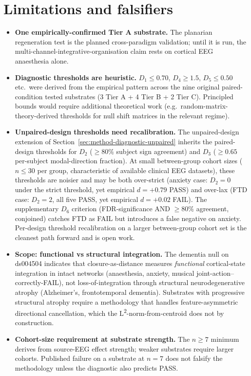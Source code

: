 \documentclass[11pt,a4paper]{article}
\begin{document}
\section{Limitations and falsifiers}\label{sec:limits}

\begin{itemize}\itemsep0pt
\item \textbf{One empirically-confirmed Tier A substrate.} The planarian regeneration test is the planned cross-paradigm validation; until it is run, the multi-channel-integrative-organisation claim rests on cortical EEG anaesthesia alone.
\item \textbf{Diagnostic thresholds are heuristic.} $D_1 \leq 0.70$, $D_4 \geq 1.5$, $D_5 \leq 0.50$ etc.\ were derived from the empirical pattern across the nine original paired-condition tested substrates (3 Tier A + 4 Tier B + 2 Tier C). Principled bounds would require additional theoretical work (e.g.\ random-matrix-theory-derived thresholds for null shift matrices in the relevant regime).
\item \textbf{Unpaired-design thresholds need recalibration.} The unpaired-design extension of Section~\ref{sec:method-diagnostic-unpaired} inherits the paired-design thresholds for $D_2$ ($\geq 80\%$ subject sign agreement) and $D_3$ ($\geq 0.65$ per-subject modal-direction fraction). At small between-group cohort sizes ($n \leq 30$ per group, characteristic of available clinical EEG datasets), these thresholds are noisier and may be both over-strict (anxiety case: $D_2 = 0$ under the strict threshold, yet empirical $d = +0.79$ PASS) and over-lax (FTD case: $D_2 = 2$, all five PASS, yet empirical $d = +0.02$ FAIL). The supplementary $D_6$ criterion (FDR-significance AND $\geq 80\%$ agreement, conjoined) catches FTD as FAIL but introduces a false negative on anxiety. Per-design threshold recalibration on a larger between-group cohort set is the cleanest path forward and is open work.
\item \textbf{Scope: functional vs structural integration.} The dementia null on ds004504 indicates that closure-as-distance measures \emph{functional} cortical-state integration in intact networks (anaesthesia, anxiety, musical joint-action--correctly-FAIL), not loss-of-integration through structural neurodegenerative atrophy (Alzheimer's, frontotemporal dementia). Substrates with progressive structural atrophy require a methodology that handles feature-asymmetric directional cancellation, which the L\textsuperscript{2}-norm-from-centroid does not by construction.
\item \textbf{Cohort-size requirement at substrate strength.} The $n \geq 7$ minimum derives from source-EEG effect strength; weaker substrates require larger cohorts. Published failure on a substrate at $n = 7$ does not falsify the methodology unless the diagnostic also predicts PASS.

\end{itemize}
\end{document}
